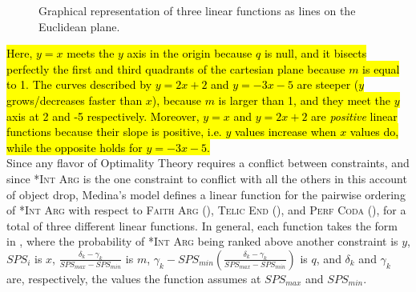 \begin{figure}[htb]
\caption{Graphical representation of three linear functions as lines on the Euclidean plane.}
\end{figure}

\hl{Here, $y = x$ meets the $y$ axis in the origin because $q$ is null, and it bisects perfectly the first and third quadrants of the cartesian plane because $m$ is equal to 1. The curves described by $y = 2x + 2$ and $y = -3x - 5$ are steeper ($y$ grows/decreases faster than $x$), because $m$ is larger than 1, and they meet the $y$ axis at 2 and -5 respectively. Moreover, $y = x$ and $y = 2x + 2$ are \textit{positive} linear functions because their slope is positive, i.e. $y$ values increase when $x$ values do, while the opposite holds for $y = -3x - 5$.}\\
Since any flavor of Optimality Theory requires a conflict between constraints, and since \textsc{*Int Arg} is the one constraint to conflict with all the others in this account of object drop, Medina's model defines a linear function for the pairwise ordering of \textsc{*Int Arg} with respect to \textsc{Faith Arg} (), \textsc{Telic End} (), and \textsc{Perf Coda} (), for a total of three different linear functions. In general, each function takes the form in , where the probability of \textsc{*Int Arg} being ranked above another constraint is $y$, $SPS_i$ is $x$, $\frac{\delta_k - \gamma_k}{SPS_{max} - SPS_{min}}$ is $m$, $\gamma_k - SPS_{min} (\frac{\delta_k - \gamma_k}{SPS_{max} - SPS_{min}})$ is $q$, and $\delta_k$ and $\gamma_k$ are, respectively, the values the function assumes at $SPS_{max}$ and $SPS_{min}$.

